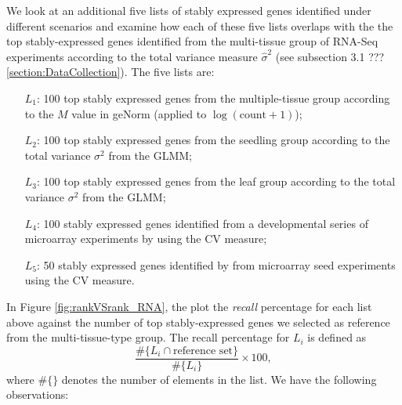 \documentclass[11pt, a4paper]{article}
\begin{document}
We look at an additional five lists of stably expressed genes identified under
different scenarios and examine how each of these five lists overlaps with the
the top stably-expressed genes identified from the multi-tissue group  of
RNA-Seq experiments  according to the total variance measure $\hat\sigma^2$
(see subsection 3.1 ??? \ref{section:DataCollection}). 
The five lists are: 
\begin{enumerate}
    \item[$L_1$:]
 100 top stably expressed genes from the multiple-tissue group according
 to the $M$ value in geNorm (applied to $\log(\text{count}+1)$); 
\item[$L_2$:]	
100 top stably expressed genes from the seedling group according to the total variance $\sigma^2$ from the GLMM;
\item[$L_3$:]
100 top stably expressed genes from the leaf group according to the total variance $\sigma^2$ from the GLMM; 
\item[$L_4$:]
100 stably expressed genes identified from a developmental series of microarray
experiments by \cite{czechowski2005genome} using the CV measure; 
\item[$L_5$:] 50 stably expressed genes identified by \cite{dekkers2012identification} from microarray
seed experiments using the CV measure.  
\end{enumerate}
In Figure \ref{fig:rankVSrank_RNA}, the plot the {\em recall} percentage for
each list above against the number of top stably-expressed genes we selected
as reference from the multi-tissue-type group. 
The recall percentage for $L_i$ is defined as 
\[ \frac{ \#	 \{L_i \cap \text{reference set} \}}{\# \{L_i\}}\times 100, \]
where $\#\{ \}$ denotes the number of elements in the list.
We have the following observations:
\end{document}
